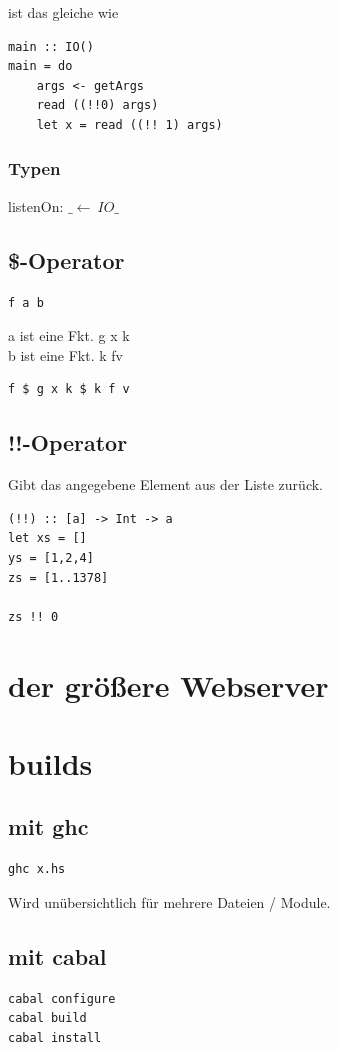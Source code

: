 \documentclass[ngerman,a4paper]{report}
\begin{document}
ist das gleiche wie
\begin{lstlisting}
main :: IO()
main = do
	args <- getArgs
	read ((!!0) args)
	let x = read ((!! 1) args)
\end{lstlisting}

\subsubsection{Typen}

listenOn: $\_ \leftarrow \ IO\_$

\subsection{\$-Operator}
\begin{lstlisting}
f a b
\end{lstlisting}
a ist eine Fkt. g x k\\
b ist eine Fkt. k fv

\begin{lstlisting}
f $ g x k $ k f v
\end{lstlisting}

\subsection{!!-Operator}
Gibt das angegebene Element aus der Liste zurück.
\begin{lstlisting}
(!!) :: [a] -> Int -> a
let xs = []
ys = [1,2,4]
zs = [1..1378]

zs !! 0
\end{lstlisting}
\section{der größere Webserver}

\section{builds}
\subsection{mit ghc}
\begin{lstlisting}
ghc x.hs
\end{lstlisting}
Wird unübersichtlich für mehrere Dateien / Module.

\subsection{mit cabal}
\begin{lstlisting}
cabal configure
cabal build
cabal install
\end{lstlisting}
\end{document}
